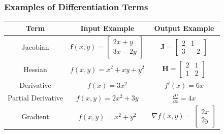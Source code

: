 \documentclass{beamer}
\begin{document}
\begin{frame}
    \frametitle{Examples of Differentiation Terms}

    \begin{table}[h]
        \centering
        \begin{tabular}{|c|c|c|}
            \hline
            \textbf{Term}      & \textbf{Input Example}                          & \textbf{Output Example}                       \\
            \hline
            Jacobian           & $\mathbf{f}(x, y) = \begin{bmatrix} 2x + y \\ 3x - 2y \end{bmatrix}$ & $\mathbf{J} = \begin{bmatrix} 2 & 1 \\ 3 & -2 \end{bmatrix}$     \\
            \hline
            Hessian            & $f(x, y) = x^2 + xy + y^2$                      & $\mathbf{H} = \begin{bmatrix} 2 & 1 \\ 1 & 2 \end{bmatrix}$     \\
            \hline
            Derivative         & $f(x) = 3x^2$                                   & $f'(x) = 6x$                                  \\
            \hline
            Partial Derivative & $f(x, y) = 2x^2 + 3y$                           & $\frac{\partial f}{\partial x} = 4x$          \\
            \hline
            Gradient           & $f(x, y) = x^2 + y^2$                           & $\nabla f(x, y) = \begin{bmatrix} 2x \\ 2y \end{bmatrix}$ \\
            \hline
        \end{tabular}
    \end{table}

\end{frame}
\end{document}
